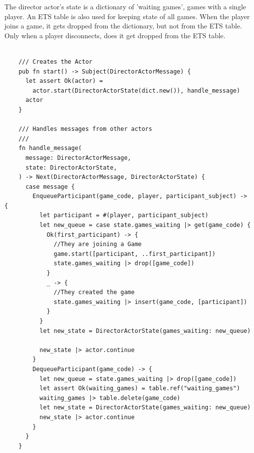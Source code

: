 \documentclass[]{interim}
\begin{document}
\begin{minipage}[t]{18em}

  The director actor's state is a dictionary of 'waiting games',
  games with a single player. An ETS table is also used for keeping
  state of all games. When the player joins a game, it gets dropped
  from the dictionary, but not from the ETS table. Only when a player
  disconnects, does it get dropped from the ETS table.

\end{minipage}
\hfill
\begin{minipage}[t]{20em}
  \begin{lstlisting}

    /// Creates the Actor
    pub fn start() -> Subject(DirectorActorMessage) {
      let assert Ok(actor) =
        actor.start(DirectorActorState(dict.new()), handle_message)
      actor
    }

    /// Handles messages from other actors
    ///
    fn handle_message(
      message: DirectorActorMessage,
      state: DirectorActorState,
    ) -> Next(DirectorActorMessage, DirectorActorState) {
      case message {
        EnqueueParticipant(game_code, player, participant_subject) -> {
          let participant = #(player, participant_subject)
          let new_queue = case state.games_waiting |> get(game_code) {
            Ok(first_participant) -> {
              //They are joining a Game
              game.start([participant, ..first_participant])
              state.games_waiting |> drop([game_code])
            }
            _ -> {
              //They created the game
              state.games_waiting |> insert(game_code, [participant])
            }
          }
          let new_state = DirectorActorState(games_waiting: new_queue)

          new_state |> actor.continue
        }
        DequeueParticipant(game_code) -> {
          let new_queue = state.games_waiting |> drop([game_code])
          let assert Ok(waiting_games) = table.ref("waiting_games")
          waiting_games |> table.delete(game_code)
          let new_state = DirectorActorState(games_waiting: new_queue)
          new_state |> actor.continue
        }
      }
    }

      \end{lstlisting}
  \label{fig: 6}
\end{minipage}

\newpage
\end{document}
